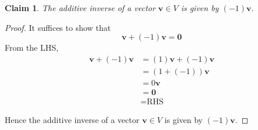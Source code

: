 \documentclass{article}
\newtheorem*{claim}{Claim}
\begin{document}
\begin{claim}
    The additive inverse of a vector $\mathbf{v} \in V$ is given by $(-1)\mathbf{v}$.
\end{claim}

\begin{proof}
    It suffices to show that 
    \[
    \mathbf{v} + (-1)\mathbf{v} = \mathbf{0}
    \]
    From the LHS,
    \[
    \begin{aligned}
        \mathbf{v} + (-1)\mathbf{v} &= (1)\mathbf{v} + (-1)\mathbf{v} \\
        &= (1 + (-1))\mathbf{v} \\
        &= 0\mathbf{v} \\
        &= \mathbf{0} \\
        &= \text{RHS}
    \end{aligned}
    \]

    \medskip

    Hence the additive inverse of a vector $\mathbf{v} \in V$ is given by $(-1)\mathbf{v}$.
\end{proof}
\end{document}
